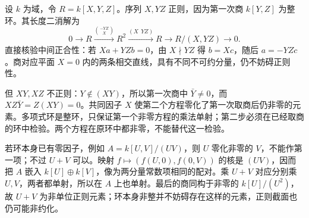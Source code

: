 设 \(k\) 为域，令 \(R=k[X,Y,Z]\)。序列 \(X,YZ\) 正则，因为第一次商 \(k[Y,Z]\) 为整环。其长度二消解为
\[
	0\longrightarrow R\xrightarrow{\binom{-YZ}{X}}R^2 \xrightarrow{(X\ \ YZ)}R\longrightarrow R/(X,YZ)\longrightarrow0.
\]
直接核验中间正合性：若 \(Xa+YZb=0\)，由 \(X\nmid YZ\) 得 \(b=Xc\)，随后 \(a=-YZc\)。商对应平面 \(X=0\) 内的两条相交直线，具有不同不可约分量，仍不妨碍正则性。

\ProseParagraphBreak
但 \(XY,XZ\) 不正则：\(Y\notin(XY)\)，所以第一次商中 \(\bar Y\ne0\)，而 \(XZ\bar Y=Z(XY)=0\)。共同因子 \(X\) 使第二个方程零化了第一次取商后仍非零的元素。多项式环是整环，只保证第一个非零方程的乘法单射；第二步必须在已经取商的环中检验。两个方程在原环中都非零，不能替代这一检验。

\ProseParagraphBreak
若环本身已有零因子，例如 \(A=k[U,V]/(UV)\)，则 \(U\) 零化非零的 \(V\)，不能作第一项；不过 \(U+V\) 可以。映射 \(f\mapsto(f(U,0),f(0,V))\) 的核是 \((UV)\)，因而把 \(A\) 嵌入 \(k[U]\oplus k[V]\)，像为两分量常数项相同的配对。乘 \(U+V\) 对应分别乘 \(U,V\)，两者都单射，所以在 \(A\) 上也单射。最后的商同构于非零的 \(k[U]/(U^2)\)，故 \(U+V\) 为非单位正则元素；环本身非整并不妨碍存在这样的元素，正则截面也仍可能非约化。
